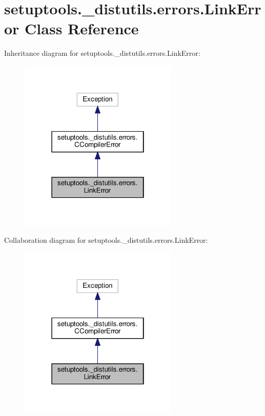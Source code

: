 \hypertarget{classsetuptools_1_1__distutils_1_1errors_1_1LinkError}{}\section{setuptools.\+\_\+distutils.\+errors.\+Link\+Error Class Reference}
\label{classsetuptools_1_1__distutils_1_1errors_1_1LinkError}


Inheritance diagram for setuptools.\+\_\+distutils.\+errors.\+Link\+Error\+:
\nopagebreak
\begin{figure}[H]
\begin{center}
\leavevmode
\includegraphics[width=214pt]{classsetuptools_1_1__distutils_1_1errors_1_1LinkError__inherit__graph}
\end{center}
\end{figure}


Collaboration diagram for setuptools.\+\_\+distutils.\+errors.\+Link\+Error\+:
\nopagebreak
\begin{figure}[H]
\begin{center}
\leavevmode
\includegraphics[width=214pt]{classsetuptools_1_1__distutils_1_1errors_1_1LinkError__coll__graph}
\end{center}
\end{figure}


